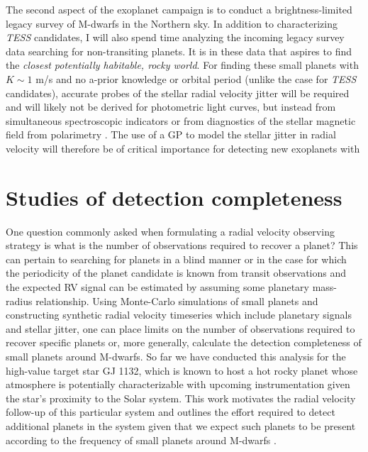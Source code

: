 The second aspect of the \spirou{} exoplanet campaign is to conduct a 
brightness-limited 
legacy survey of M-dwarfs in the Northern sky. In addition to characterizing 
\emph{TESS} candidates, I will also spend time analyzing the incoming legacy 
survey data searching for non-transiting planets. 
It is in these data that \spirou{} aspires to find the 
\emph{closest potentially habitable, rocky world}. %
For finding these small planets with 
$K \sim 1$ m/s and no a-prior knowledge or orbital period (unlike the case for 
\emph{TESS} candidates), accurate probes of the stellar radial velocity jitter 
will be required and will likely not be derived for photometric 
light curves, but instead from simultaneous spectroscopic indicators 
\citep{rajpaul15} or from diagnostics of the stellar magnetic field from 
polarimetry \citep{donati15}. %
The use of a GP to model the stellar jitter in radial velocity will therefore 
be of critical importance for detecting new exoplanets with  

\section{Studies of detection completeness}
One question commonly asked when formulating a radial velocity observing 
strategy is what is the number of observations required to recover a planet? 
This can pertain 
to searching for planets in a blind manner or in the case for which the 
periodicity of the planet candidate is known from transit observations and the 
expected RV signal can be estimated by assuming some planetary mass-radius 
relationship. Using Monte-Carlo simulations of small planets and constructing 
synthetic radial velocity timeseries which include planetary signals and 
stellar jitter, one can place limits on the number of observations required to 
recover specific planets or, more generally, calculate the detection 
completeness of small planets around M-dwarfs. 
So far we have conducted this analysis for the high-value 
target star GJ 1132, which is known to host a hot rocky planet \citep{berta15} 
whose atmosphere is potentially characterizable with upcoming instrumentation 
given the star's proximity to the Solar system. This work motivates the 
radial velocity follow-up of this particular system and outlines the effort 
required to detect additional planets in the system given that we expect 
such planets to be present according to the frequency of small planets around 
M-dwarfs \citep{dressing15a}.

